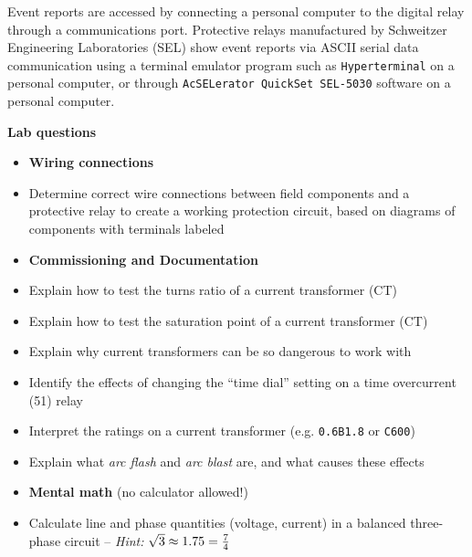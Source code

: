 Event reports are accessed by connecting a personal computer to the digital relay through a communications port.  Protective relays manufactured by Schweitzer Engineering Laboratories (SEL) show event reports via ASCII serial data communication using a terminal emulator program such as {\tt Hyperterminal} on a personal computer, or through {\tt AcSELerator QuickSet SEL-5030} software on a personal computer.












\vfil \eject

\noindent
{\bf Lab questions}

\vskip 5pt

\begin{itemize}
\item{} {\bf Wiring connections}
\item{} Determine correct wire connections between field components and a protective relay to create a working protection circuit, based on diagrams of components with terminals labeled
\end{itemize}

\filbreak

\begin{itemize}
\item{} {\bf Commissioning and Documentation}
\item{} Explain how to test the turns ratio of a current transformer (CT)
\item{} Explain how to test the saturation point of a current transformer (CT)
\item{} Explain why current transformers can be so dangerous to work with
\item{} Identify the effects of changing the ``time dial'' setting on a time overcurrent (51) relay
\item{} Interpret the ratings on a current transformer (e.g. {\tt 0.6B1.8} or {\tt C600})
\item{} Explain what {\it arc flash} and {\it arc blast} are, and what causes these effects
\end{itemize}

\filbreak

\begin{itemize}
\item{} {\bf Mental math} (no calculator allowed!)
\item{} Calculate line and phase quantities (voltage, current) in a balanced three-phase circuit -- {\it Hint:} $\sqrt{3} \approx 1.75 = {7 \over 4}$
\end{itemize}

